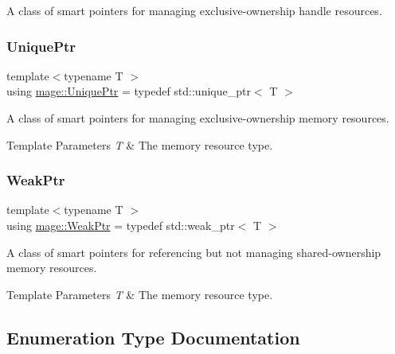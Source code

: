 A class of smart pointers for managing exclusive-\/ownership handle resources. \hypertarget{namespacemage_a8c307fbcc33bce9b7f2aa4c26c3b95cf}{}\label{namespacemage_a8c307fbcc33bce9b7f2aa4c26c3b95cf} 
\subsubsection{\texorpdfstring{Unique\+Ptr}{UniquePtr}}
{\footnotesize\ttfamily template$<$typename T $>$ \\
using \hyperlink{namespacemage_a8c307fbcc33bce9b7f2aa4c26c3b95cf}{mage\+::\+Unique\+Ptr} = typedef std\+::unique\+\_\+ptr$<$ T $>$}

A class of smart pointers for managing exclusive-\/ownership memory resources.


\begin{DoxyTemplParams}{Template Parameters}
{\em T} & The memory resource type. \\
\hline
\end{DoxyTemplParams}
\hypertarget{namespacemage_aa159a63c0d58464bdf32dfe419dd5dc1}{}\label{namespacemage_aa159a63c0d58464bdf32dfe419dd5dc1} 
\subsubsection{\texorpdfstring{Weak\+Ptr}{WeakPtr}}
{\footnotesize\ttfamily template$<$typename T $>$ \\
using \hyperlink{namespacemage_aa159a63c0d58464bdf32dfe419dd5dc1}{mage\+::\+Weak\+Ptr} = typedef std\+::weak\+\_\+ptr$<$ T $>$}

A class of smart pointers for referencing but not managing shared-\/ownership memory resources.


\begin{DoxyTemplParams}{Template Parameters}
{\em T} & The memory resource type. \\
\hline
\end{DoxyTemplParams}


\subsection{Enumeration Type Documentation}
\hypertarget{namespacemage_ae7a7a03a7b34d7e2689689bb8295cd38}{}\label{namespacemage_ae7a7a03a7b34d7e2689689bb8295cd38} 
